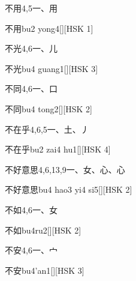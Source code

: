 \begin{entry}{不用}{4,5}{⼀、⽤}
  \begin{phonetics}{不用}{bu2 yong4}[][HSK 1]
  \end{phonetics}
\end{entry}

\begin{entry}{不光}{4,6}{⼀、⼉}
  \begin{phonetics}{不光}{bu4 guang1}[][HSK 3]
  \end{phonetics}
\end{entry}

\begin{entry}{不同}{4,6}{⼀、⼝}
  \begin{phonetics}{不同}{bu4 tong2}[][HSK 2]
  \end{phonetics}
\end{entry}

\begin{entry}{不在乎}{4,6,5}{⼀、⼟、⼃}
  \begin{phonetics}{不在乎}{bu2 zai4 hu1}[][HSK 4]
  \end{phonetics}
\end{entry}

\begin{entry}{不好意思}{4,6,13,9}{⼀、⼥、⼼、⼼}
  \begin{phonetics}{不好意思}{bu4 hao3 yi4 si5}[][HSK 2]
  \end{phonetics}
\end{entry}

\begin{entry}{不如}{4,6}{⼀、⼥}
  \begin{phonetics}{不如}{bu4ru2}[][HSK 2]
  \end{phonetics}
\end{entry}

\begin{entry}{不安}{4,6}{⼀、⼧}
  \begin{phonetics}{不安}{bu4'an1}[][HSK 3]
  \end{phonetics}
\end{entry}

